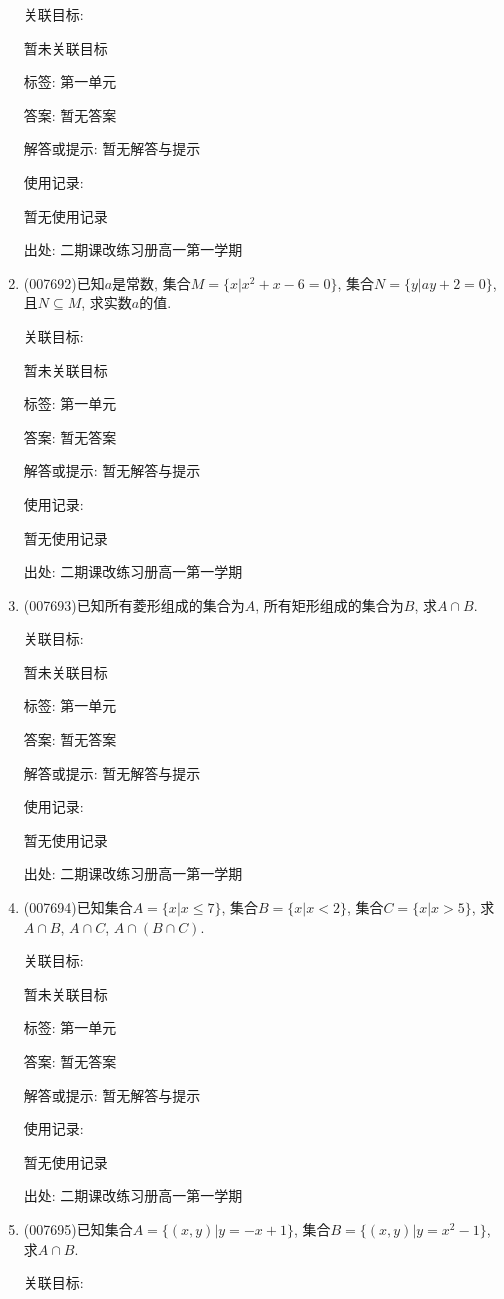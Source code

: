 \documentclass[10pt,a4paper]{article}
\begin{document}
\begin{enumerate}[1.]
关联目标:

暂未关联目标



标签: 第一单元

答案: 暂无答案

解答或提示: 暂无解答与提示

使用记录:

暂无使用记录


出处: 二期课改练习册高一第一学期
\item { (007692)}已知$a$是常数, 集合$M=\{x|x^2+x-6=0\}$, 集合$N=\{y|ay+2=0\}$, 且$N\subseteq M$, 求实数$a$的值.


关联目标:

暂未关联目标



标签: 第一单元

答案: 暂无答案

解答或提示: 暂无解答与提示

使用记录:

暂无使用记录


出处: 二期课改练习册高一第一学期
\item { (007693)}已知所有菱形组成的集合为$A$, 所有矩形组成的集合为$B$, 求$A\cap B$.


关联目标:

暂未关联目标



标签: 第一单元

答案: 暂无答案

解答或提示: 暂无解答与提示

使用记录:

暂无使用记录


出处: 二期课改练习册高一第一学期
\item { (007694)}已知集合$A=\{x|x\le 7\}$, 集合$B=\{x|x<2\}$, 集合$C=\{x|x>5\}$, 求$A\cap B$, $A\cap C$, $A\cap (B\cap C)$.


关联目标:

暂未关联目标



标签: 第一单元

答案: 暂无答案

解答或提示: 暂无解答与提示

使用记录:

暂无使用记录


出处: 二期课改练习册高一第一学期
\item { (007695)}已知集合$A=\{(x,y)|y=-x+1\}$, 集合$B=\{(x,y)|y=x^2-1\}$, 求$A\cap B$.


关联目标:


\end{enumerate}
\end{document}
